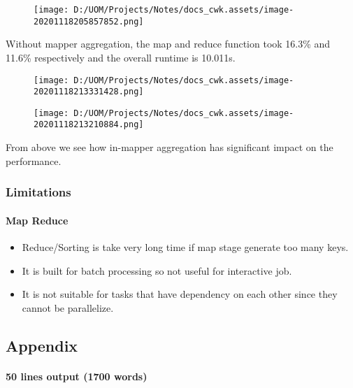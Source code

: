 \documentclass[
]{article}
\begin{document}
\begin{figure}
\centering
\texttt{[image: D:/UOM/Projects/Notes/docs\_cwk.assets/image-20201118205857852.png]}
\caption{}
\end{figure}

Without mapper aggregation, the map and reduce function took 16.3\% and
11.6\% respectively and the overall runtime is 10.011s.

\begin{figure}
\centering
\texttt{[image: D:/UOM/Projects/Notes/docs\_cwk.assets/image-20201118213331428.png]}
\caption{}
\end{figure}

\begin{figure}
\centering
\texttt{[image: D:/UOM/Projects/Notes/docs\_cwk.assets/image-20201118213210884.png]}
\caption{}
\end{figure}

From above we see how in-mapper aggregation has significant impact on
the performance.

\hypertarget{header-n106}{%
\subsubsection{Limitations}\label{header-n106}}

\hypertarget{header-n107}{%
\paragraph{Map Reduce}\label{header-n107}}

\begin{itemize}
\item
  Reduce/Sorting is take very long time if map stage generate too many
  keys.
\item
  It is built for batch processing so not useful for interactive job.
\item
  It is not suitable for tasks that have dependency on each other since
  they cannot be parallelize.
\end{itemize}

\hypertarget{header-n108}{%
\subsection{Appendix}\label{header-n108}}

\hypertarget{header-n116}{%
\paragraph{50 lines output (1700 words)}\label{header-n116}}
\end{document}
